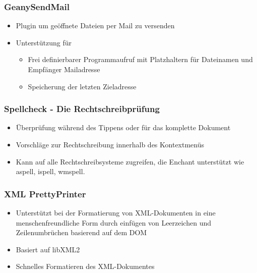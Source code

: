 \begin{frame}
  \frametitle{GeanySendMail}
  \begin{block}{}
    \begin{itemize}
      \item Plugin um geöffnete Dateien per Mail zu versenden
      \item Unterstützung für
        \begin{itemize}
        \item Frei definierbarer Programmaufruf mit Platzhaltern für
          Dateinamen und Empfänger Mailadresse
        \item Speicherung der letzten Zieladresse
        \end{itemize}
    \end{itemize}    
  \end{block}
\end{frame}

\begin{frame}
  \frametitle{Spellcheck - Die Rechtschreibprüfung}
  \begin{block}{}
    \begin{itemize}
    \item Überprüfung während des Tippens oder für das komplette
      Dokument
    \item Vorschläge zur Rechtschreibung innerhalb des Kontextmenüs
    \item Kann auf alle Rechtschreibsysteme zugreifen, die Enchant
      unterstützt wie aspell, ispell, wmspell.
    \end{itemize}
  \end{block}
\end{frame}

\begin{frame}
    \frametitle{XML PrettyPrinter}
    \begin{block}{}
    \begin{itemize}
        \item Unterstützt bei der Formatierung von XML-Dokumenten
              in eine menschenfreundliche Form durch einfügen von
              Leerzeichen und Zeilenumbrüchen basierend auf dem DOM
        \item Basiert auf libXML2
        \item Schnelles Formatieren des XML-Dokumentes
    \end{itemize}
    \end{block}
\end{frame}

